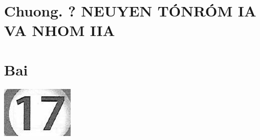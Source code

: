 \documentclass[10pt]{article}
\begin{document}
\section*{Chuong. ? NEUYEN TÓNRÓM IA VA NHOM IIA}
\section*{Bai}
\begin{center}
\includegraphics[max width=\textwidth]{2025_10_23_de6f5713836e4e91b3c8g-102}
\end{center}
\end{document}
